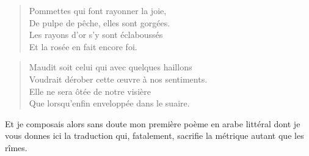 \begin{verse}
Pommettes qui font rayonner la joie,\\
De pulpe de pêche, elles sont gorgées.\\
Les rayons d’or s’y sont éclaboussés\\
Et la rosée en fait encore foi.
\end{verse}

\begin{verse}
Maudit soit celui qui avec quelques haillons\\
Voudrait dérober cette œuvre à nos sentiments.\\
Elle ne sera ôtée de notre visière\\
Que lorsqu’enfin enveloppée dans le suaire.\\
\end{verse}

\begin{prose}
Et je composais alors sans doute mon première poème en arabe littéral dont je vous donnes ici la traduction qui, fatalement, sacrifie la métrique autant que les rîmes.
\end{prose}

